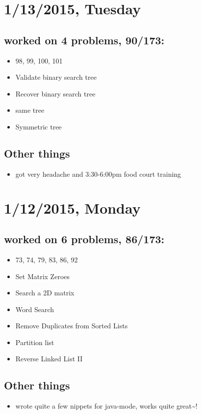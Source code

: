 \documentclass[9pt,b5paper]{article}
\begin{document}
\section{1/13/2015, Tuesday}
\label{sec-13}
\subsection{worked on 4 problems, 90/173:}
\label{sec-13-1}
\begin{itemize}
\item 98, 99, 100, 101
\item Validate binary search tree
\item Recover binary search tree
\item same tree
\item Symmetric tree
\end{itemize}
\subsection{Other things}
\label{sec-13-2}
\begin{itemize}
\item got very headache and 3:30-6:00pm food court training
\end{itemize}
\section{1/12/2015, Monday}
\label{sec-14}
\subsection{worked on 6 problems, 86/173:}
\label{sec-14-1}
\begin{itemize}
\item 73, 74, 79, 83, 86, 92
\item Set Matrix Zeroes
\item Search a 2D matrix
\item Word Search
\item Remove Duplicates from Sorted Lists
\item Partition list
\item Reverse Linked List II
\end{itemize}
\subsection{Other things}
\label{sec-14-2}
\begin{itemize}
\item wrote quite a few nippets for java-mode, works quite great\textasciitilde{}!
\end{itemize}
\end{document}

